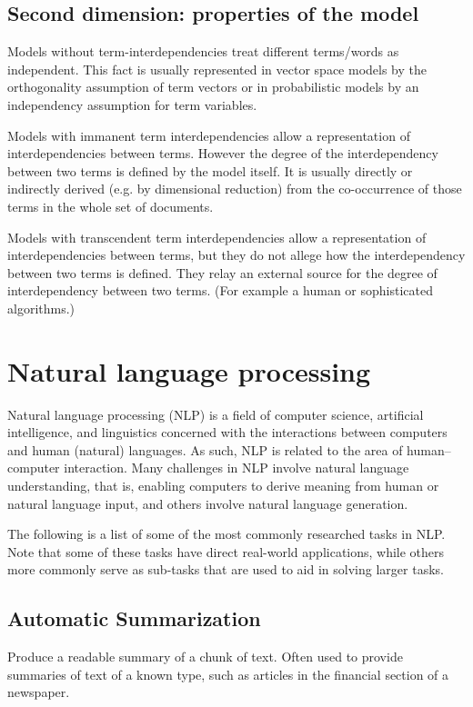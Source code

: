 \documentclass[12pt]{book}
\begin{document}
\subsection{Second dimension: properties of the model}
\begin{itemize*}
  \item Models without term-interdependencies treat different terms/words as independent. This fact is usually represented in vector space models by the orthogonality assumption of term vectors or in probabilistic models by an independency assumption for term variables.
  \item Models with immanent term interdependencies allow a representation of interdependencies between terms. However the degree of the interdependency between two terms is defined by the model itself. It is usually directly or indirectly derived (e.g. by dimensional reduction) from the co-occurrence of those terms in the whole set of documents.
  \item Models with transcendent term interdependencies allow a representation of interdependencies between terms, but they do not allege how the interdependency between two terms is defined. They relay an external source for the degree of interdependency between two terms. (For example a human or sophisticated algorithms.)
\end{itemize*}

\section{Natural language processing}
Natural language processing (NLP)\cite{wikipedia-nlp} is a field of computer science, artificial intelligence, and linguistics concerned with the interactions between computers and human (natural) languages. As such, NLP is related to the area of human–computer interaction. Many challenges in NLP involve natural language understanding, that is, enabling computers to derive meaning from human or natural language input, and others involve natural language generation.

The following is a list of some of the most commonly researched tasks in NLP. Note that some of these tasks have direct real-world applications, while others more commonly serve as sub-tasks that are used to aid in solving larger tasks. 
\subsection{Automatic Summarization}
Produce a readable summary of a chunk of text. Often used to provide summaries of text of a known type, such as articles in the financial section of a newspaper.
\end{document}
